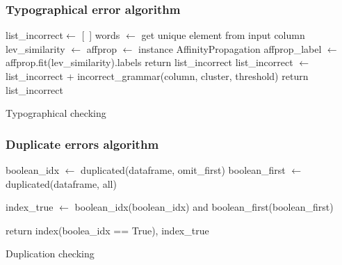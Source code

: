 \documentclass{article}
\begin{document}
\subsubsection{Typographical error algorithm}
\label{sub:Typographical error algorithm}
\begin{algorithm}[H]
    \BlankLine

    list\_incorrect$\leftarrow$ [~]\;
    words $\leftarrow$ get unique element from input column\;
    {
        lev\_similarity $\leftarrow$ 
        affprop $\leftarrow$ instance AffinityPropagation\;
        affprop\_label $\leftarrow$ affprop.fit(lev\_similarity).labels \;
        {
            return list\_incorrect\;
        }
        {
            {list\_incorrect $\leftarrow$ list\_incorrect + incorrect\_grammar(column, cluster, threshold)\;}
        }
        return list\_incorrect
    }
    \caption{Typographical checking\label{typo}}
\end{algorithm}



\subsubsection{Duplicate errors algorithm}

\begin{algorithm}[H]
    \BlankLine
    boolean\_idx $\leftarrow$ duplicated(dataframe, omit\_first)\;
    boolean\_first $\leftarrow$ duplicated(dataframe, all)\;

    index\_true $\leftarrow$ boolean\_idx(boolean\_idx) and boolean\_first(boolean\_first)\;

    return index(boolea\_idx == True), index\_true
    \caption{Duplication checking\label{duplicate}}
\end{algorithm}
\end{document}
